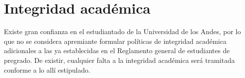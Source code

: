 \section{Integridad académica}
Existe gran confianza en el estudiantado de la Universidad de los Andes, por lo que no se considera apremiante formular políticas de integridad académica adicionales a las ya establecidas en el Reglamento general de estudiantes de pregrado. De existir, cualquier falta a la integridad académica será tramitada conforme a lo allí estipulado.
